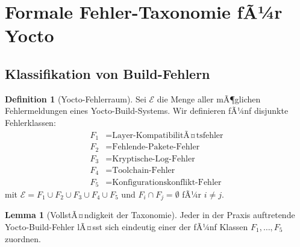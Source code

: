 ﻿\documentclass[a4paper,12pt]{article}
\theoremstyle{definition}
\newtheorem{definition}{Definition}
\newtheorem{lemma}{Lemma}
\begin{document}
\section{Formale Fehler-Taxonomie fÃ¼r Yocto}

\subsection{Klassifikation von Build-Fehlern}

\begin{definition}[Yocto-Fehlerraum]
	Sei $\mathcal{E}$ die Menge aller mÃ¶glichen Fehlermeldungen eines Yocto-Build-Systems.
	Wir definieren fÃ¼nf disjunkte Fehlerklassen:
	\begin{align*}
		F_1 &= \text{Layer-KompatibilitÃ¤tsfehler} \\
		F_2 &= \text{Fehlende-Pakete-Fehler} \\
		F_3 &= \text{Kryptische-Log-Fehler} \\
		F_4 &= \text{Toolchain-Fehler} \\
		F_5 &= \text{Konfigurationskonflikt-Fehler}
	\end{align*}
	mit $\mathcal{E} = F_1 \cup F_2 \cup F_3 \cup F_4 \cup F_5$ und $F_i \cap F_j = \emptyset$ fÃ¼r $i \neq j$.
\end{definition}

\begin{lemma}[VollstÃ¤ndigkeit der Taxonomie]
\label{lem:vollstaendig}
	Jeder in der Praxis auftretende Yocto-Build-Fehler lÃ¤sst sich eindeutig
	einer der fÃ¼nf Klassen $F_1, \ldots, F_5$ zuordnen.
\end{lemma}
\end{document}
